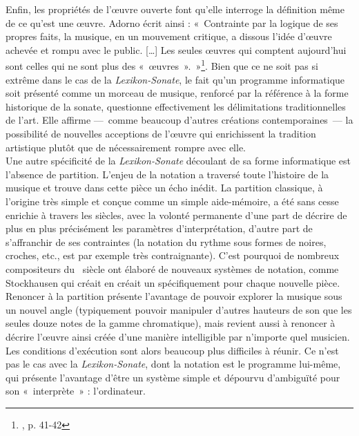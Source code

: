 \documentclass[a4paper,12pt]{article}
\newcommand{\guill}[1]{«~#1~»}
\begin{document}
Enfin, les propriétés de l'œuvre ouverte font qu'elle interroge la définition même de ce qu'est une œuvre. Adorno écrit ainsi : \guill{Contrainte par la logique de ses propres faits, la musique, en un mouvement critique, a dissous l'idée d'œuvre achevée et rompu avec le public. [\dots] Les seules œuvres qui comptent aujourd'hui sont celles qui ne sont plus des \guill{œuvres}.}\footnote{\cite{adorno1949philosophie}, p. 41-42}. Bien que ce ne soit pas si extrême dans le cas de la \emph{Lexikon-Sonate}, le fait qu'un programme informatique soit présenté comme un morceau de musique, renforcé par la référence à la forme historique de la sonate, questionne effectivement les délimitations traditionnelles de l'art. Elle affirme ---~comme beaucoup d'autres créations contemporaines~--- la possibilité de nouvelles acceptions de l'œuvre qui enrichissent la tradition artistique plutôt que de nécessairement rompre avec elle. \\

Une autre spécificité de la \emph{Lexikon-Sonate} découlant de sa forme informatique est l'absence de partition. L'enjeu de la notation a traversé toute l'histoire de la musique et trouve dans cette pièce un écho inédit. La partition classique, à l'origine très simple et conçue comme un simple aide-mémoire, a été sans cesse enrichie à travers les siècles, avec la volonté permanente d'une part de décrire de plus en plus précisément les paramètres d'interprétation, d'autre part de s'affranchir de ses contraintes (la notation du rythme sous formes de noires, croches, etc., est par exemple très contraignante). C'est pourquoi de nombreux compositeurs du \XXe~siècle ont élaboré de nouveaux systèmes de notation, comme Stockhausen qui créait en créait un spécifiquement pour chaque nouvelle pièce. %
Renoncer à la partition présente l'avantage de pouvoir explorer la musique sous un nouvel angle (typiquement pouvoir manipuler d'autres hauteurs de son que les seules douze notes de la gamme chromatique), mais revient aussi à renoncer à décrire l'œuvre ainsi créée d'une manière intelligible par n'importe quel musicien. Les conditions d'exécution sont alors beaucoup plus difficiles à réunir. Ce n'est pas le cas avec la \emph{Lexikon-Sonate}, dont la notation est le programme lui-même, qui présente l'avantage d'être un système simple et dépourvu d'ambiguïté pour son \guill{interprète} : l'ordinateur.
\end{document}
